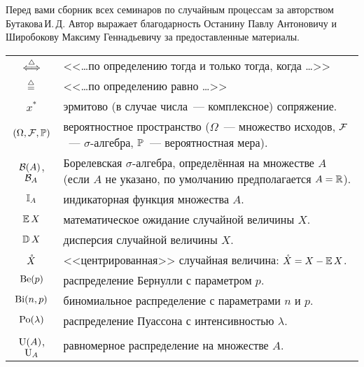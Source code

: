  \label{sec:intro}

Перед вами сборник всех семинаров по случайным процессам за авторством Бутакова\,И.\,Д.
Автор выражает благодарность Останину Павлу Антоновичу и Широбокову Максиму Геннадьевичу за предоставленные материалы.


\begin{center}
    \begin{tabularx}{\textwidth}{cl}
        $ \overset{\triangle}{\Longleftrightarrow} $                      & <<\ldots по определению тогда и только тогда, когда \ldots>> \\
        $ \overset{\triangle}{=} $                       & <<\ldots по определению равно \ldots>> \\
        $ x^* $                          & эрмитово (в случае числа~--- комплексное) сопряжение. \\
        \rule{0pt}{16pt}%
        $ (\Omega, \mathcal{F}, \mathbb{P}) $ & \makecell[l]{вероятностное пространство ($ \Omega $~--- множество исходов, $ \mathcal{F} $~--- $ \sigma $-алгебра, \\ $ \mathbb{P} $~--- вероятностная мера).} \\
        $ \mathcal{B}(A) $, $ \mathcal{B}_A $      & \makecell[l]{Борелевская $ \sigma $-алгебра, определённая на множестве $ A $ (если $ A $ не указано, \\ по умолчанию предполагается $ A = \mathbb{R} $).} \\
        $ \mathbb{I}_A $                 & индикаторная функция множества $ A $. \\
        $ \operatorname{\mathbb{E}} X $                    & математическое ожидание случайной величины $ X $. \\
        $ \operatorname{\mathbb{D}} X $                & дисперсия случайной величины $ X $. \\
        $ \mathring{X} $                  & <<центрированная>> случайная величина: $ \mathring{X} = X - \operatorname{\mathbb{E}} X $. \\
        \rule{0pt}{16pt}%
        $ \textnormal{Be}(p) $                & распределение Бернулли с параметром $ p $. \\
        $ \textnormal{Bi}(n, p) $              & биномиальное распределение с параметрами $ n $ и $ p $. \\
        $ \textnormal{Po}(\lambda) $            & распределение Пуассона с интенсивностью $ \lambda $. \\
        $ \textnormal{U}(A)$, $ \textnormal{U}_A $   & равномерное распределение на множестве $ A $. \\

\end{tabularx}
\end{center}
